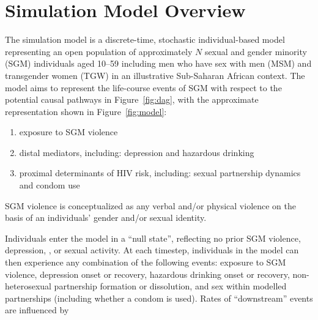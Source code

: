 \section{Simulation Model Overview}\label{mod.ov}
The simulation model is a discrete-time, stochastic individual-based model
representing an open population
of approximately $N$ sexual and gender minority (SGM) individuals aged 10--59
including men who have sex with men (MSM) and transgender women (TGW) in
an illustrative Sub-Saharan African context.
The model aims to represent the life-course events of SGM with respect to
the potential causal pathways in Figure~\ref{fig:dag},
with the approximate representation shown in Figure~\ref{fig:model}:
\begin{enumerate}[label=\roman*)]
  \item exposure to SGM violence
  \item distal mediators, including:
        depression and hazardous drinking
  \item proximal determinants of HIV risk, including:
        sexual partnership dynamics and condom use
\end{enumerate}
SGM violence is conceptualized as any verbal and/or physical violence
on the basis of an individuals' gender and/or sexual identity.
\par
Individuals enter the model in a ``null state'', reflecting
no prior SGM violence, depression, \hazdrink, or sexual activity.
At each timestep, individuals in the model can then experience
any combination of the following events:
exposure to SGM violence,
depression onset or recovery,
hazardous drinking onset or recovery,
non-heterosexual partnership formation or dissolution,
and sex within modelled partnerships (including whether a condom is used).
Rates of ``downstream'' events are influenced by
